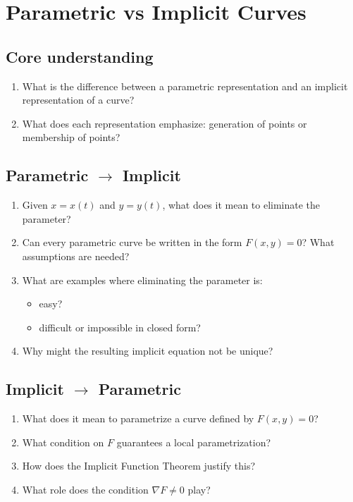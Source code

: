 \section{Parametric vs Implicit Curves}

\subsection{Core understanding}

\begin{enumerate}
  \item What is the difference between a parametric representation and an implicit representation of a curve?
  \item What does each representation emphasize: generation of points or membership of points?
\end{enumerate}

\subsection{Parametric \(\to\) Implicit}

\begin{enumerate}[resume]
  \item Given \(x = x(t)\) and \(y = y(t)\), what does it mean to eliminate the parameter?
  \item Can every parametric curve be written in the form \(F(x,y) = 0\)? What assumptions are needed?
  \item What are examples where eliminating the parameter is:
    \begin{itemize}
      \item easy?
      \item difficult or impossible in closed form?
    \end{itemize}
  \item Why might the resulting implicit equation not be unique?
\end{enumerate}

\subsection{Implicit \(\to\) Parametric}

\begin{enumerate}[resume]
  \item What does it mean to parametrize a curve defined by \(F(x,y) = 0\)?
  \item What condition on \(F\) guarantees a local parametrization?
  \item How does the Implicit Function Theorem justify this?
  \item What role does the condition \(\nabla F \neq 0\) play?
\end{enumerate}


